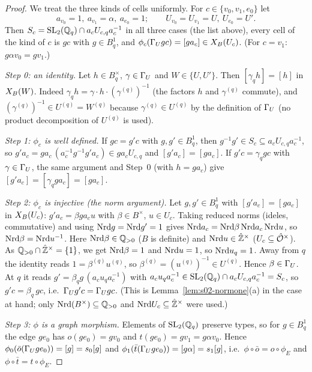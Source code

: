 \begin{proof}
We treat the three kinds of cells uniformly. For $c\in\{v_0,v_1,e_0\}$ let
\[a_{v_0}=1,\ a_{v_1}=\alpha,\ a_{e_0}=1;\qquad U_{v_0}=U_{v_1}=U,\ U_{e_0}=U'.\]
Then $S_c=\mathrm{SL}_2(\mathbb{Q}_q)\cap a_cU_{c,q}a_c^{-1}$ in all three cases (the list above), every cell of the kind of $c$ is $gc$ with
$g\in B^1_q$, and $\phi_c(\Gamma_U gc)=[ga_c]\in X_B(U_c)$. (For $c=v_1$: $g\alpha v_0=gv_1$.)

\emph{Step 0: an identity.} Let $h\in B_q^\times$, $\gamma\in\Gamma_U$ and $W\in\{U,U'\}$. Then $[\gamma_qh]=[h]$ in $X_B(W)$. Indeed
$\gamma_qh=\gamma\cdot h\cdot(\gamma^{(q)})^{-1}$ (the factors $h$ and $\gamma^{(q)}$ commute), and $(\gamma^{(q)})^{-1}\in U^{(q)}=W^{(q)}$
because $\gamma^{(q)}\in U^{(q)}$ by the definition of $\Gamma_U$ (no product decomposition of $U^{(q)}$ is used).

\emph{Step 1: $\phi_c$ is well defined.} If $gc=g'c$ with $g,g'\in B^1_q$, then $g^{-1}g'\in S_c\subseteq a_cU_{c,q}a_c^{-1}$, so
$g'a_c=ga_c\,(a_c^{-1}g^{-1}g'a_c)\in ga_cU_{c,q}$ and $[g'a_c]=[ga_c]$. If $g'c=\gamma_qgc$ with $\gamma\in\Gamma_U$, the same argument
and Step~0 (with $h=ga_c$) give $[g'a_c]=[\gamma_qga_c]=[ga_c]$.

\emph{Step 2: $\phi_c$ is injective (the norm argument).} Let $g,g'\in B^1_q$ with $[g'a_c]=[ga_c]$ in $X_B(U_c)$: $g'a_c=\beta ga_cu$
with $\beta\in B^\times$, $u\in U_c$. Taking reduced norms (ideles, commutative) and using $\mathrm{Nrd} g=\mathrm{Nrd} g'=1$ gives
$\mathrm{Nrd} a_c=\mathrm{Nrd}\beta\,\mathrm{Nrd} a_c\,\mathrm{Nrd} u$, so $\mathrm{Nrd}\beta=\mathrm{Nrd} u^{-1}$. Here $\mathrm{Nrd}\beta\in\mathbb{Q}_{>0}$ ($B$ is definite) and
$\mathrm{Nrd} u\in\hat{\mathbb{Z}}^\times$ ($U_c\subseteq\hat{\mathcal{O}}^\times$). As $\mathbb{Q}_{>0}\cap\hat{\mathbb{Z}}^\times=\{1\}$, we get $\mathrm{Nrd}\beta=1$ and $\mathrm{Nrd} u=1$, so
$\mathrm{Nrd} u_q=1$. Away from $q$ the identity reads $1=\beta^{(q)}u^{(q)}$, so $\beta^{(q)}=(u^{(q)})^{-1}\in U^{(q)}$. Hence
$\beta\in\Gamma_U$. At $q$ it reads $g'=\beta_qg\,(a_cu_qa_c^{-1})$ with $a_cu_qa_c^{-1}\in\mathrm{SL}_2(\mathbb{Q}_q)\cap a_cU_{c,q}a_c^{-1}=S_c$, so
$g'c=\beta_q\,gc$, i.e.\ $\Gamma_U g'c=\Gamma_U gc$. (This is Lemma~\ref{lem:s02-normone}(a) in the case at hand; only
$\mathrm{Nrd}(B^\times)\subseteq\mathbb{Q}_{>0}$ and $\mathrm{Nrd} U_c\subseteq\hat{\mathbb{Z}}^\times$ were used.)

\emph{Step 3: $\phi$ is a graph morphism.} Elements of $\mathrm{SL}_2(\mathbb{Q}_q)$ preserve types, so for $g\in B^1_q$ the edge $ge_0$ has
$o(ge_0)=gv_0$ and $t(ge_0)=gv_1=g\alpha v_0$. Hence $\phi_0(\bar o(\Gamma_U ge_0))=[g]=s_0[g]$ and
$\phi_1(\bar t(\Gamma_U ge_0))=[g\alpha]=s_1[g]$, i.e.\ $\phi\circ\bar o=o\circ\phi_E$ and $\phi\circ\bar t=t\circ\phi_E$.


\end{proof}
